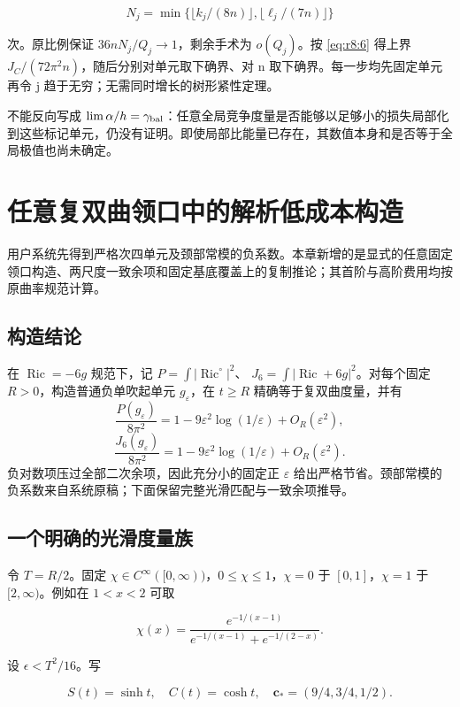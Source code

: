 \documentclass[UTF8,11pt,openany,oneside,fontset=none]{ctexbook}
\begin{document}
\[
N_j=\min\{\lfloor k_j/(8n)\rfloor,\lfloor\ell_j/(7n)\rfloor\}
\]

次。原比例保证 \(36nN_j/Q_j\to1\)，剩余手术为 \(o(Q_j)\)。按 \eqref{eq:r8:6} 得上界 \(J_C/(72\pi^2n)\)，随后分别对单元取下确界、对 n 取下确界。每一步均先固定单元再令 j 趋于无穷；无需同时增长的树形紧性定理。

不能反向写成 \(\lim\alpha/h=\gamma_{\rm bal}\)：任意全局竞争度量是否能够以足够小的损失局部化到这些标记单元，仍没有证明。即使局部比能量已存在，其数值本身和是否等于全局极值也尚未确定。


\chapter{任意复双曲领口中的解析低成本构造}\label{chapter:9}
用户系统先得到严格次四单元及颈部常模的负系数。本章新增的是显式的任意固定领口构造、两尺度一致余项和固定基底覆盖上的复制推论；其首阶与高阶费用均按原曲率规范计算。\cite{R09,System,CellSource}

\section{构造结论}\label{ch9:ux6784ux9020ux7ed3ux8bba}

在 \(\operatorname{Ric}=-6g\) 规范下，记 \(P=\int|\operatorname{Ric}^{\circ}|^2\)、 \(J_6=\int|\operatorname{Ric}+6g|^2\)。对每个固定 \(R>0\)，构造普通负单吹起单元 \(g_\varepsilon\)，在 \(t\ge R\) 精确等于复双曲度量，并有 \[
\frac{P(g_\varepsilon)}{8\pi^2}
=1-9\varepsilon^2\log(1/\varepsilon)+O_R(\varepsilon^2),
\] \[
\frac{J_6(g_\varepsilon)}{8\pi^2}
=1-9\varepsilon^2\log(1/\varepsilon)+O_R(\varepsilon^2).
\tag{9.1}\label{eq:r9:1}
\] 负对数项压过全部二次余项，因此充分小的固定正 \(\varepsilon\) 给出严格节省。颈部常模的负系数来自系统原稿；下面保留完整光滑匹配与一致余项推导。

\section{一个明确的光滑度量族}\label{ch9:ux4e00ux4e2aux660eux786eux7684ux5149ux6ed1ux5ea6ux91cfux65cf}

令 \(T=R/2\)。固定 \(\chi\in C^\infty([0,\infty))\)，\(0\le\chi\le1\)，\(\chi=0\) 于 \([0,1]\)，\(\chi=1\) 于 \([2,\infty)\)。例如在 \(1<x<2\) 可取

\[
\chi(x)=\frac{e^{-1/(x-1)}}{e^{-1/(x-1)}+e^{-1/(2-x)}}.
\]

设 \(\epsilon<T^2/16\)。写

\[
S(t)=\sinh t,\quad C(t)=\cosh t,\quad
\mathbf c_*=(9/4,3/4,1/2).
\]
\end{document}

